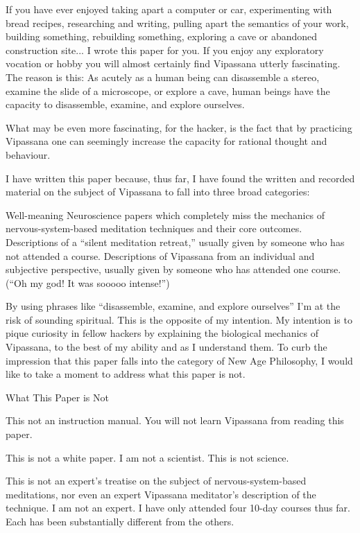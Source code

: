 \documentclass{article}
\begin{document}
If you have ever enjoyed taking apart a computer or car, experimenting with bread recipes, researching and writing, pulling apart the semantics of your work, building something, rebuilding something, exploring a cave or abandoned construction site... I wrote this paper for you. If you enjoy any exploratory vocation or hobby you will almost certainly find Vipassana utterly fascinating. The reason is this: As acutely as a human being can disassemble a stereo, examine the slide of a microscope, or explore a cave, human beings have the capacity to disassemble, examine, and explore ourselves.

What may be even more fascinating, for the hacker, is the fact that by practicing Vipassana one can seemingly increase the capacity for rational thought and behaviour.

I have written this paper because, thus far, I have found the written and recorded material on the subject of Vipassana to fall into three broad categories:

Well-meaning Neuroscience papers which completely miss the mechanics of nervous-system-based meditation techniques and their core outcomes.
Descriptions of a ``silent meditation retreat,'' usually given by someone who has not attended a course. \cite{thenewsroom}
Descriptions of Vipassana from an individual and subjective perspective, usually given by someone who has attended one course. (``Oh my god! It was sooooo intense!'')

By using phrases like ``disassemble, examine, and explore ourselves'' I'm at the risk of sounding spiritual. This is the opposite of my intention. My intention is to pique curiosity in fellow hackers by explaining the biological mechanics of Vipassana, to the best of my ability and as I understand them. To curb the impression that this paper falls into the category of New Age Philosophy, I would like to take a moment to address what this paper is not.

\pagebreak

\begin{center}
  \Huge{What This Paper is Not}
\end{center}


This not an instruction manual. You will not learn Vipassana from reading this paper.

This is not a white paper. I am not a scientist. This is not science.

This is not an expert's treatise on the subject of nervous-system-based meditations, nor even an expert Vipassana meditator's description of the technique. I am not an expert. I have only attended four 10-day courses thus far. Each has been substantially different from the others.
\end{document}
